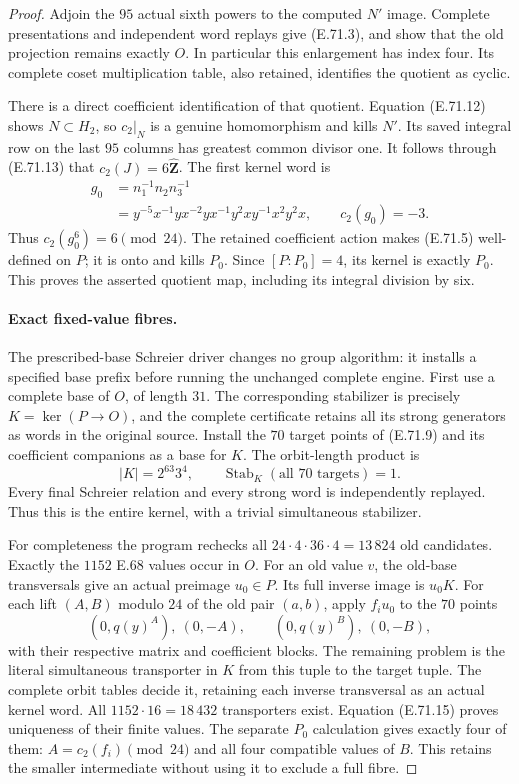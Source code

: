 \begin{proof}
Adjoin the $95$ actual sixth powers to the computed
$N'$ image. Complete presentations and independent
word replays give (E.71.3), and show that the old
projection remains exactly $O$. In particular this
enlargement has index four. Its complete coset
multiplication table, also retained, identifies the
quotient as cyclic.

There is a direct coefficient identification of
that quotient. Equation (E.71.12) shows $N\subset
H_2$, so $c_2|_N$ is a genuine homomorphism and
kills $N'$. Its saved integral row on the last
$95$ columns has greatest common divisor one.
It follows through (E.71.13) that
$c_2(J)=6\widehat{\mathbf Z}$. The first kernel word is
\[
 \begin{split}
 g_0&=n_1^{-1}n_2n_3^{-1}\\
    &=y^{-5}x^{-1}yx^{-2}yx^{-1}y^2xy^{-1}x^2y^2x,
       \qquad c_2(g_0)=-3.
 \end{split}
 \tag{E.71.14}
\]
Thus $c_2(g_0^6)=6\pmod{24}$. The retained coefficient
action makes (E.71.5) well-defined on $P$; it is onto
and kills $P_0$. Since $[P:P_0]=4$, its kernel is
exactly $P_0$. This proves the asserted quotient map,
including its integral division by six.

\paragraph{Exact fixed-value fibres.}
The prescribed-base Schreier driver changes no
group algorithm: it installs a specified base prefix
before running the unchanged complete engine.
First use a complete base of $O$, of length $31$.
The corresponding stabilizer is precisely
$K=\ker(P\to O)$, and the complete certificate retains
all its strong generators as words in the original
source. Install the $70$ target points of (E.71.9)
and its coefficient companions as a base for $K$.
The orbit-length product is
\[
           |K|=2^{63}3^4,
 \qquad \operatorname{Stab}_K(\text{all 70 targets})=1.
 \tag{E.71.15}
\]
Every final Schreier relation and every strong word
is independently replayed. Thus this is the entire
kernel, with a trivial simultaneous stabilizer.

For completeness the program rechecks all
$24\cdot4\cdot36\cdot4=13\,824$ old candidates.
Exactly the $1152$ E.68 values occur in $O$.
For an old value $v$, the old-base transversals give
an actual preimage $u_0\in P$. Its full inverse
image is $u_0K$. For each lift $(A,B)$ modulo $24$
of the old pair $(a,b)$, apply $f_i u_0$ to the
$70$ points
\[
 (0,q(y)^A),\ (0,-A),\qquad
 (0,q(y)^B),\ (0,-B),
 \tag{E.71.16}
\]
with their respective matrix and coefficient blocks.
The remaining problem is the literal simultaneous
transporter in $K$ from this tuple to the target
tuple. The complete orbit tables decide it, retaining
each inverse transversal as an actual kernel word.
All $1152\cdot16=18\,432$ transporters exist.
Equation (E.71.15) proves uniqueness of their finite
values. The separate $P_0$ calculation gives exactly
four of them: $A=c_2(f_i)\pmod{24}$ and all four
compatible values of $B$. This retains the smaller
intermediate without using it to exclude a full fibre.


\end{proof}
